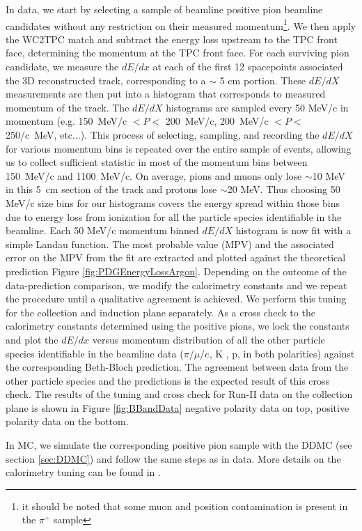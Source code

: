 In data, we start by selecting a sample of beamline positive pion beamline candidates without any restriction on their measured momentum\footnote{it should be noted that some muon and position contamination is present in the $\pi^+$ sample}.
We then apply the WC2TPC match and subtract the energy loss upstream to the TPC front face, determining the momentum at the TPC front face. For each surviving pion candidate,  we measure the $dE/dx$ at each of the first 12 spacepoints associated the 3D reconstructed track, corresponding to a $\sim$ 5 cm portion. These $dE/dX$ measurements are then put into a histogram that corresponds to measured momentum of the track. The $dE/dX$ histograms are sampled every 50 MeV/c in momentum (e.g. 150~MeV/c $< P <$ 200~MeV/c, 200~MeV/c $< P <$ 250/c~MeV, etc...).   This process of selecting, sampling, and recording the $dE/dX$ for various momentum bins is repeated over the entire sample of events, allowing us to collect sufficient statistic in most of the momentum bins between 150~MeV/c and 1100~MeV/c. On average, pions and muons only lose $\sim$10 MeV in this 5~cm section of the track and protons lose $\sim$20 MeV. Thus choosing 50 MeV/c size bins for our histograms covers the energy spread within those bins due to energy loss from ionization for all the particle species identifiable in the beamline. 
Each 50 MeV/c momentum binned $dE/dX$ histogram is now fit with a simple Landau function. The most probable value (MPV) and the associated error on the MPV from the fit are extracted and plotted against the theoretical prediction Figure \ref{fig:PDGEnergyLossArgon}. Depending on the outcome of the data-prediction comparison, we modify the calorimetry constants and we repeat the procedure until a qualitative agreement is achieved.  We perform this  tuning for the collection and induction plane separately. 
As a cross check to the calorimetry constants determined using the positive pions, we lock the constants and  plot the $dE/dx$ versus momentum distribution of all the other particle species identifiable in the beamline data ($\pi/\mu/e$, K , p, in both polarities) against the corresponding Beth-Bloch prediction. The agreement between data from the other particle species and the predictions is the expected result of this cross check.
The results of the tuning and cross check for Run-II data on the collection plane is shown in Figure \ref{fig:BBandData}  negative polarity data on top, positive polarity data on the bottom.

In MC, we simulate the corresponding positive pion sample with the DDMC (see section \ref{sec:DDMC}) and follow the same steps as in data. More details on the calorimetry tuning can be found in \cite{LArIATCalo}.

